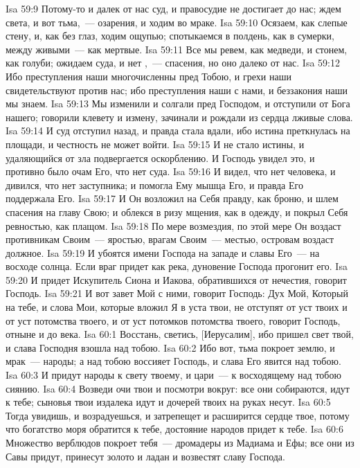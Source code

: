 \vs Isa 59:9 Потому-то и далек от нас суд, и правосудие не достигает до нас; ждем света, и вот тьма,~--- озарения, и ходим во мраке.
\vs Isa 59:10 Осязаем, как слепые стену, и, как без глаз, ходим ощупью; спотыкаемся в полдень, как в сумерки, между живыми~--- как мертвые.
\vs Isa 59:11 Все мы ревем, как медведи, и стонем, как голуби; ожидаем суда, и нет ,~--- спасения, но оно далеко от нас.
\vs Isa 59:12 Ибо преступления наши многочисленны пред Тобою, и грехи наши свидетельствуют против нас; ибо преступления наши с нами, и беззакония наши мы знаем.
\vs Isa 59:13 Мы изменили и солгали пред Господом, и отступили от Бога нашего; говорили клевету и измену, зачинали и рождали из сердца лживые слова.
\vs Isa 59:14 И суд отступил назад, и правда стала вдали, ибо истина преткнулась на площади, и честность не может войти.
\vs Isa 59:15 И не стало истины, и удаляющийся от зла подвергается оскорблению. И Господь увидел это, и противно было очам Его, что нет суда.
\vs Isa 59:16 И видел, что нет человека, и дивился, что нет заступника; и помогла Ему мышца Его, и правда Его поддержала Его.
\vs Isa 59:17 И Он возложил на Себя правду, как броню, и шлем спасения на главу Свою; и облекся в ризу мщения, как в одежду, и покрыл Себя ревностью, как плащом.
\vs Isa 59:18 По мере возмездия, по этой мере Он воздаст противникам Своим~--- яростью, врагам Своим~--- местью, островам воздаст должное.
\vs Isa 59:19 И убоятся имени Господа на западе и славы Его~--- на восходе солнца. Если враг придет как река, дуновение Господа прогонит его.
\vs Isa 59:20 И придет Искупитель Сиона и  Иакова, обратившихся от нечестия, говорит Господь.
\vs Isa 59:21 И вот завет Мой с ними, говорит Господь: Дух Мой, Который на тебе, и слова Мои, которые вложил Я в уста твои, не отступят от уст твоих и от уст потомства твоего, и от уст потомков потомства твоего, говорит Господь, отныне и до века.
\vs Isa 60:1 Восстань, светись, [Иерусалим], ибо пришел свет твой, и слава Господня взошла над тобою.
\vs Isa 60:2 Ибо вот, тьма покроет землю, и мрак~--- народы; а над тобою воссияет Господь, и слава Его явится над тобою.
\vs Isa 60:3 И придут народы к свету твоему, и цари~--- к восходящему над тобою сиянию.
\vs Isa 60:4 Возведи очи твои и посмотри вокруг: все они собираются, идут к тебе; сыновья твои издалека идут и дочерей твоих на руках несут.
\vs Isa 60:5 Тогда увидишь, и возрадуешься, и затрепещет и расширится сердце твое, потому что богатство моря обратится к тебе, достояние народов придет к тебе.
\vs Isa 60:6 Множество верблюдов покроет тебя~--- дромадеры из Мадиама и Ефы; все они из Савы придут, принесут золото и ладан и возвестят славу Господа.
